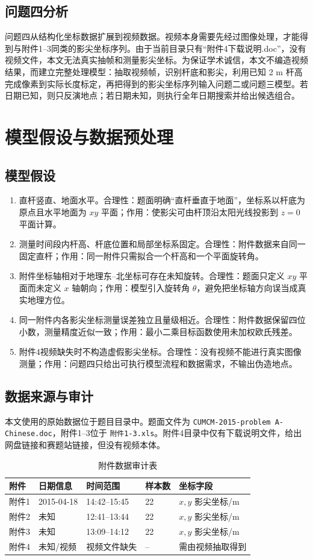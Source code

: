 \documentclass[UTF8,a4paper,12pt]{ctexart}
\begin{document}
\subsection{问题四分析}
问题四从结构化坐标数据扩展到视频数据。视频本身需要先经过图像处理，才能得到与附件1--3同类的影尖坐标序列。由于当前目录只有“附件4下载说明.doc”，没有视频文件，本文无法真实抽帧和测量影尖坐标。为保证学术诚信，本文不编造视频结果，而建立完整处理模型：抽取视频帧，识别杆底和影尖，利用已知 2 m 杆高完成像素到实际长度标定，再把得到的影尖坐标序列输入问题二或问题三模型。若日期已知，则只反演地点；若日期未知，则执行全年日期搜索并给出候选组合。

\section{模型假设与数据预处理}
\subsection{模型假设}
\begin{enumerate}[label=\textbf{假设\arabic*：}]
  \item 直杆竖直、地面水平。合理性：题面明确“直杆垂直于地面”，坐标系以杆底为原点且水平地面为 $xy$ 平面；作用：使影尖可由杆顶沿太阳光线投影到 $z=0$ 平面计算。
  \item 测量时间段内杆高、杆底位置和局部坐标系固定。合理性：附件数据来自同一固定直杆；作用：同一附件只需拟合一个杆高和一个平面旋转角。
  \item 附件坐标轴相对于地理东--北坐标可存在未知旋转。合理性：题面只定义 $xy$ 平面而未定义 $x$ 轴朝向；作用：模型引入旋转角 $\theta$，避免把坐标轴方向误当成真实地理方位。
  \item 同一附件内各影尖坐标测量误差独立且量级相近。合理性：附件数据保留四位小数，测量精度近似一致；作用：最小二乘目标函数使用未加权欧氏残差。
  \item 附件4视频缺失时不构造虚假影尖坐标。合理性：没有视频不能进行真实图像测量；作用：问题四只给出可执行模型流程和数据需求，不输出伪造地点。
\end{enumerate}

\subsection{数据来源与审计}
本文使用的原始数据位于题目目录中。题面文件为 \verb|CUMCM-2015-problem A-Chinese.doc|，附件1--3位于 \verb|附件1-3.xls|。附件4目录中仅有下载说明文件，给出网盘链接和赛题站链接，但没有视频本体。

\begin{table}[H]
\centering
\caption{附件数据审计表}
\begin{tabular}{lllll}
\toprule
附件 & 日期信息 & 时间范围 & 样本数 & 坐标字段\\
\midrule
附件1 & 2015-04-18 & 14:42--15:45 & 22 & $x,y$ 影尖坐标/m\\
附件2 & 未知 & 12:41--13:44 & 22 & $x,y$ 影尖坐标/m\\
附件3 & 未知 & 13:09--14:12 & 22 & $x,y$ 影尖坐标/m\\
附件4 & 未知/视频 & 视频文件缺失 & -- & 需由视频抽取得到\\
\bottomrule
\end{tabular}
\end{table}
\end{document}
